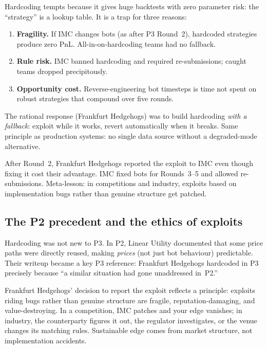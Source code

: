 \begin{pitfallbox}
Hardcoding tempts because it gives huge backtests with zero
parameter risk: the ``strategy'' is a lookup table.  It is a
trap for three reasons:
\begin{enumerate}
  \item \textbf{Fragility.}  If IMC changes bots (as after P3
        Round~2), hardcoded strategies produce zero PnL.
        All-in-on-hardcoding teams had no fallback.
  \item \textbf{Rule risk.}  IMC banned hardcoding and required
        re-submissions; caught teams dropped precipitously.
  \item \textbf{Opportunity cost.}  Reverse-engineering bot
        timesteps is time not spent on robust strategies that
        compound over five rounds.
\end{enumerate}
\end{pitfallbox}

The rational response (Frankfurt Hedgehogs) was to build
hardcoding \emph{with a fallback}: exploit while it works, revert
automatically when it breaks.  Same principle as production systems:
no single data source without a degraded-mode alternative.

After Round~2, Frankfurt Hedgehogs reported the exploit to IMC
even though fixing it cost their advantage.  IMC fixed bots for
Rounds~3--5 and allowed re-submissions.  Meta-lesson: in
competitions and industry, exploits based on implementation bugs
rather than genuine structure get patched.

\subsection{The P2 precedent and the ethics of exploits}

Hardcoding was not new to P3.  In P2, Linear Utility documented
that some price paths were directly reused, making \emph{prices}
(not just bot behaviour) predictable.  Their writeup became a
key P3 reference: Frankfurt Hedgehogs hardcoded in P3 precisely
because ``a similar situation had gone unaddressed in~P2.''

Frankfurt Hedgehogs' decision to report the exploit reflects a
principle: exploits riding bugs rather than genuine structure are
fragile, reputation-damaging, and value-destroying.  In a
competition, IMC patches and your edge vanishes; in industry, the
counterparty figures it out, the regulator investigates, or the
venue changes its matching rules.  Sustainable edge comes from
market structure, not implementation accidents.


